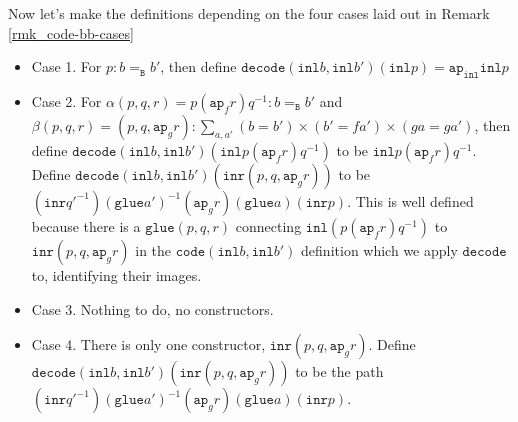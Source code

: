 \message{ !name(notes.tex)}\documentclass[12pt]{amsart}
\newcommand{\type}[1]{\mathtt{#1}}
\newcommand{\A}{\type{A}}
\newcommand{\B}{\type{B}}
\newcommand{\ap}{\type{ap}}
\newcommand{\inl}{\type{inl}}
\newcommand{\inr}{\type{inr}}
\newcommand{\glue}{\type{glue}}
\newcommand{\code}{\type{code}}
\newcommand{\decode}{\type{decode}}
\theoremstyle{remark}
\theoremstyle{definition}
\begin{document}
Now let's make the definitions depending on the four cases laid out in
Remark \ref{rmk_code-bb-cases}
\begin{itemize}
	\item Case 1. For $ p : b =_{\B} b' $, then define $ \decode (
\inl b , \inl b' ) (\inl p) = \ap_{\inl} \inl p$
	\item Case 2.  For $ \alpha (p,q,r) = p (\ap_f r) q^{-1} : b
=_{\B} b' $ and $ \beta (p,q,r) = (p,q,\ap_g r) : \sum_{a,a'} (b=b')
\times (b'=fa') \times (ga=ga') $, then define $ \decode (\inl b ,
\inl b') ( \inl p (\ap_f r) q^{-1}) $ to be $ \inl p (\ap_f r) q^{-1}
$.  Define $ \decode (\inl b , \inl b') ( \inr (p,q,\ap_g r) ) $ to be
$ (\inr q'^{-1})(\glue a')^{-1}(\ap_{g}r)(\glue a)(\inr p) $. This is
well defined because there is a $ \glue (p,q,r) $ connecting $ \inl (p
(\ap_f r) q^{-1}) $ to $ \inr (p,q,\ap_g r) $ in the $ \code (\inl b ,
\inl b') $ definition which we apply $ \decode $ to, identifying their
images.
	\item Case 3. Nothing to do, no constructors.
	\item Case 4. There is only one constructor, $ \inr (p,q,
\ap_g r) $.  Define $ \decode ( \inl b , \inl b') ( \inr (p,q, \ap_g
r) ) $ to be the path $ (\inr q'^{-1})(\glue a')^{-1}(\ap_{g}r)(\glue
a)(\inr p) $.
\end{itemize}

\end{document}
